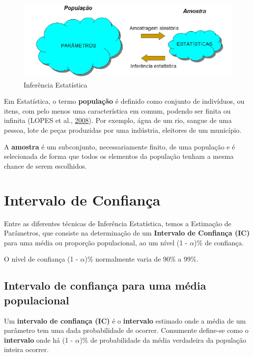 \documentclass[12pt,portuguese,oneside]{book}
\begin{document}
\begin{figure}[H]

{\centering \includegraphics[width=0.8\linewidth]{infestat} 

}

\caption{Inferência Estatística}\label{fig:infestat}
\end{figure}

Em Estatística, o termo \textbf{população} é definido como conjunto de
indivíduos, ou itens, com pelo menos uma característica em comum,
podendo ser finita ou infinita (LOPES et al.,
\protect\hyperlink{ref-lopes2008}{2008}). Por exemplo, água de um rio,
sangue de uma pessoa, lote de peças produzidas por uma indústria,
eleitores de um município.

A \textbf{amostra} é um subconjunto, necessariamente finito, de uma
população e é selecionada de forma que todos os elementos da população
tenham a mesma chance de serem escolhidos.

\section{Intervalo de Confiança}\label{intervalo-de-confianca}

Entre as diferentes técnicas de Inferência Estatística, temos a
Estimação de Parâmetros, que consiste na determinação de um
\textbf{Intervalo de Confiança (IC)} para uma média ou proporção
populacional, ao um nível (1 - \(\alpha\))\% de confiança.

O nível de confiança (1 - \(\alpha\))\% normalmente varia de 90\% a
99\%.

\subsection{Intervalo de confiança para uma média
populacional}\label{intervalo-de-confianca-para-uma-media-populacional}

Um \textbf{intervalo de confiança (IC)} é o \textbf{intervalo} estimado
onde a média de um parâmetro tem uma dada probabilidade de ocorrer.
Comumente define-se como o \textbf{intervalo} onde há (1 - \(\alpha\))\%
de probabilidade da média verdadeira da população inteira ocorrer.
\end{document}
